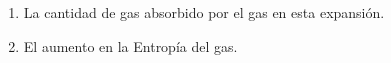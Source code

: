 \documentclass[a4paper,11pt]{extarticle} %
\begin{document}
\begin{enumerate}[label=\textbf{\arabic*}), leftmargin=*]
{                \begin{enumerate}[label=\textbf{\alph* )}]
                    \item La cantidad de gas absorbido por el gas en esta expansión.
                    \item El aumento en la Entropía del gas.
                \end{enumerate}
          }

    

    \vspace{\baselineskip}

\end{enumerate}

\printbibliography[title={Referencias.}]
\end{document}
